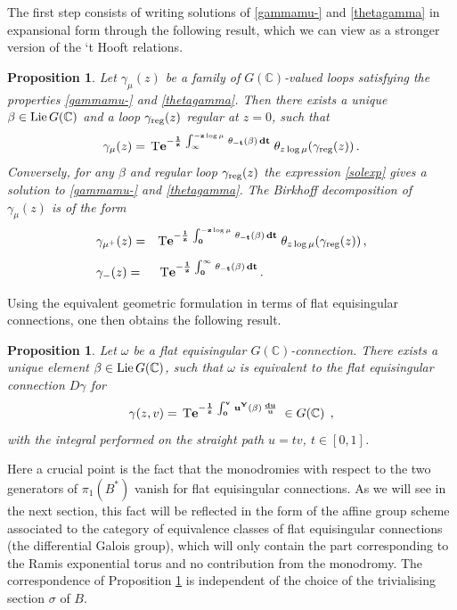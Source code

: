 \documentclass[10pt]{amsart}
\def\C{{\mathbb C}}
\def\g{\gamma}
\def\t{\theta}
\def\Lie{{\rm Lie}}
\newtheorem{prop}[thm]{Proposition}
\numberwithin{equation}{section}
\begin{document}
\smallskip

The first step consists of writing solutions of
\eqref{gammamu-} and \eqref{thetagamma} in expansional form through
the following result, which we can view as a stronger version of
the `t Hooft relations.

\begin{prop}\label{expans}
Let $\g_\mu(z)$ be a family of $G(\C)$-valued loops
satisfying the properties \eqref{gammamu-} and
\eqref{thetagamma}.
 Then there exists a unique $\beta \in {\rm Lie}\,G(\C)$
 and a loop $\g_{\rm reg}(z)$ regular at $z=0$,
 such that
\begin{equation}\label{solexp}
  \g_\mu(z) =\,{\bf {\rm T}e^{-\frac{1}{z}\,
 \int^{-z \log\mu}_\infty\,\t_{-t}(\beta)\,dt}}\;
  \t_{z\log\mu}(\g_{\rm reg}(z))\,.
\end{equation}
Conversely, for any $\beta$ and regular loop $\g_{\rm reg}(z)$ the expression
\eqref{solexp} gives a solution to \eqref{gammamu-} and
\eqref{thetagamma}.
The Birkhoff
 decomposition of $\g_\mu(z)$ is of the form
\begin{equation}\label{gammaplusminus}
\begin{array}{ll} \g_{\mu^+}(z)= & {\bf {\rm T}e^{-\frac{1}{z}
  \,\int_0^{-z \log\mu}\,\t_{-t}(\beta)\,dt}}\;
 \t_{z\log\mu}(\g_{\rm reg}(z))\,, \\[3mm]
 \g_-(z) = & \,{\bf {\rm
 T}e^{-\frac{1}{z}\,\int_0^\infty\,\t_{-t}(\beta)\,dt}}\,.
 \end{array} \end{equation}
\end{prop}

\smallskip

Using the equivalent geometric formulation in terms of flat
equisingular connections, one then obtains the following result.

\begin{prop}\label{connbeta}
Let $\omega$ be a flat equisingular $G(\C)$-connection. There
exists a unique element $\beta \in \Lie\, G(\C)$, such that
$\omega$ is equivalent to the flat
 equisingular connection $D\g$ for
\begin{equation}\label{solexpm}
 \g(z,v) =\,{\bf {\rm T}e^{-\frac{1}{z}\,
 \int^{v}_0\,u^Y(\beta)\,\frac{du}{u}}}\;
\in G(\C)\; \,,
\end{equation}
with the integral performed on the straight path $u=t v$,
$t\in[0,1]$.
\end{prop}

\smallskip

Here a crucial point is the fact that the monodromies with respect to
the two generators of $\pi_1(B^*)$ vanish for flat equisingular
connections. As we will see in the next section, this fact will be
reflected in the form of the affine group
scheme associated to the category of equivalence classes of flat
equisingular connections (the differential Galois group), which will
only contain the part corresponding to the Ramis exponential torus and
no contribution from the monodromy. The correspondence of Proposition
\ref{connbeta} is independent of the choice of the trivialising
section $\sigma$ of $B$.
\end{document}
